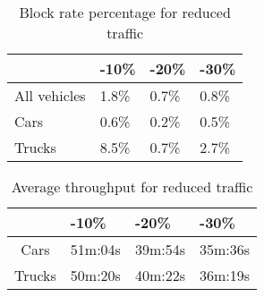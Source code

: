 \begin{table}
	\centering
	\begin{tabular}{l|l|l|l|}
		\cline{2-4}
		& -10\% & -20\% & -30\% \\ \hline
		\multicolumn{1}{|l|}{All vehicles} & 1.8\% & 0.7\% & 0.8\% \\ \hline
		\multicolumn{1}{|l|}{Cars}         & 0.6\% & 0.2\% & 0.5\% \\ \hline
		\multicolumn{1}{|l|}{Trucks}       & 8.5\% & 0.7\% & 2.7\% \\ \hline
	\end{tabular}
	\caption{Block rate percentage for reduced traffic}
	\label{tab:blockRed}
\end{table}

\begin{table}
	\centering
	\begin{tabular}{c|c|c|c|}
		\cline{2-4}
		\multicolumn{1}{l|}{}        & \multicolumn{1}{l|}{-10\%} & \multicolumn{1}{l|}{-20\%} & \multicolumn{1}{l|}{-30\%} \\ \hline
		\multicolumn{1}{|c|}{Cars}   & 51m:04s                    & 39m:54s                    & 35m:36s                    \\ \hline
		\multicolumn{1}{|c|}{Trucks} & 50m:20s                    & 40m:22s                    & 36m:19s                    \\ \hline
	\end{tabular}
	\caption{Average throughput for reduced traffic}
	\label{tab:throughputDec}
\end{table}